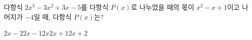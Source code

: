 다항식 $2x^3-3x^2+3x-5$를 다항식 $P(x)$로 나누었을 때의 몫이 $x^2-x+1$이고 나머지가 $-4$일 때, 다항식 $P(x)$는?
\begin{choices32}{$2x-2$}{$2x-1$}{$2x$}{$2x+1$}{$2x+2$}\end{choices32}
